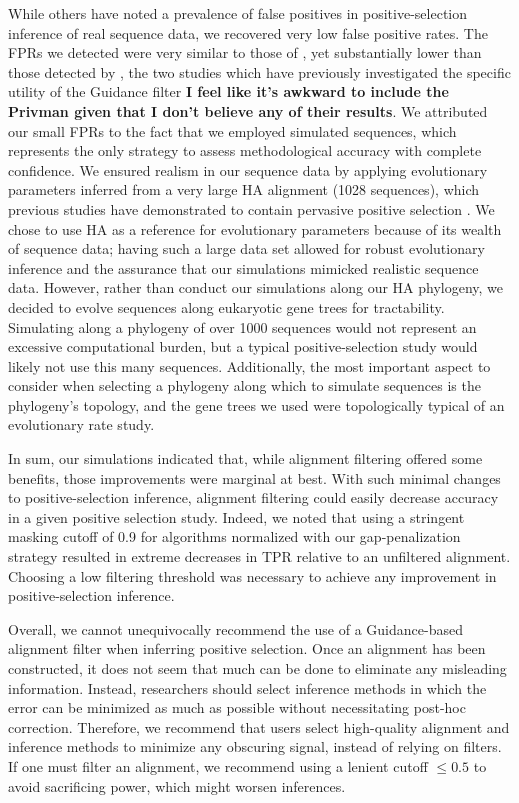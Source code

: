 \documentclass[10pt]{article}
\begin{document}
While others \citep{Schneider2009, Fletcher2010, MarkovaRaina2011,Privman2012} have noted a prevalence of false positives in positive-selection inference of real sequence data, we recovered very low false positive rates. The FPRs we detected were very similar to those of  \citet{Jordan2012}, yet substantially lower than those detected by \citet{Privman2012}, the two studies which have previously investigated the specific utility of the Guidance filter \textbf{I feel like it's awkward to include the Privman given that I don't believe any of their results}. We attributed our small FPRs to the fact that we employed simulated sequences, which represents the only strategy to assess methodological accuracy with complete confidence.  We ensured realism in our sequence data by applying evolutionary parameters inferred from a very large HA alignment (1028 sequences), which previous studies have demonstrated to contain pervasive positive selection \citep{Bush1999, Kryazhimskiy2008, Meyer2012}. We chose to use HA as a reference for evolutionary parameters because of its wealth of sequence data; having such a large data set allowed for robust evolutionary inference and the assurance that our simulations mimicked realistic sequence data. However, rather than conduct our simulations along our HA phylogeny, we decided to evolve sequences along eukaryotic gene trees for tractability. Simulating along a phylogeny of over 1000 sequences would not represent an excessive computational burden, but a typical positive-selection study would likely not use this many sequences. Additionally, the most important aspect to consider when selecting a phylogeny along which to simulate sequences is the phylogeny's topology, and the gene trees we used were topologically typical of an evolutionary rate study.

In sum, our simulations indicated that, while alignment filtering offered some benefits, those improvements were marginal at best. With such minimal changes to positive-selection inference, alignment filtering could easily decrease accuracy in a given positive selection study. Indeed, we noted that using a stringent masking cutoff of 0.9 for algorithms normalized with our gap-penalization strategy resulted in extreme decreases in TPR relative to an unfiltered alignment. Choosing a low filtering threshold was necessary to achieve any improvement in positive-selection inference.  

Overall, we cannot unequivocally recommend the use of a Guidance-based alignment filter when inferring positive selection. Once an alignment has been constructed, it does not seem that much can be done to eliminate any misleading information. Instead, researchers should select inference methods in which the error can be minimized as much as possible without necessitating post-hoc correction. Therefore, we recommend that users select high-quality alignment and inference methods to minimize any obscuring signal, instead of relying on filters. If one must filter an alignment, we recommend using a lenient cutoff $\leq0.5$ to avoid sacrificing power, which might worsen inferences.
\end{document}
